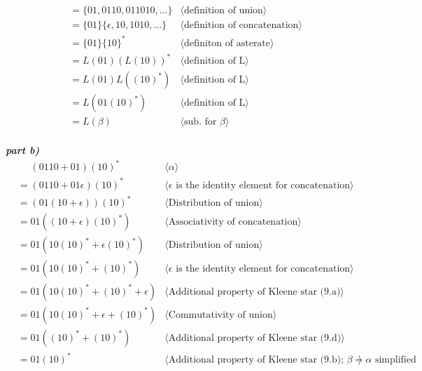 \documentclass[11pt,fleqn]{article}
\newcommand{\pnote}[1]{{\langle \text{#1} \rangle}}
\begin{document}
\begin{align*}
    &= \{01, 0110, 011010,...\} & \pnote{definition of union}\\
    &= \{01\}\{\epsilon, 10, 1010,...\} & \pnote{definition of concatenation}\\
    &= \{01\}\{10\}^* & \pnote{definiton of asterate}\\
    &= L(01)(L(10))^* & \pnote{definition of L}\\
    &= L(01)L((10)^*) & \pnote{definition of L}\\
    &= L(01(10)^*) & \pnote{definition of L}\\
    &= L(\beta) & \pnote{sub. for $\beta$}\\
\end{align*}


\textbf{\emph{part b)}}
\begin{align*}
    &\phantom{{}=} (0110+01)(10)^* & \pnote{$\alpha$}\\
    &= (0110+01\epsilon)(10)^* & \pnote{$\epsilon$ is the identity element for concatenation}\\
    &= (01(10+\epsilon))(10)^* & \pnote{Distribution of union}\\
    &= 01((10+\epsilon)(10)^*) & \pnote{Associativity of concatenation}\\
    &= 01(10(10)^*+\epsilon(10)^*) & \pnote{Distribution of union}\\
    &= 01(10(10)^*+(10)^*) & \pnote{$\epsilon$ is the identity element for concatenation}\\
    &= 01(10(10)^*+(10)^*+\epsilon) & \pnote{Additional property of Kleene star (9.a)}\\
    &= 01(10(10)^*+\epsilon+(10)^*) & \pnote{Commutativity of union}\\
    &= 01((10)^*+(10)^*) & \pnote{Additional property of Kleene star (9.d)}\\
    &= 01(10)^* & \pnote{Additional property of Kleene star (9.b); $\beta = \alpha$ simplified}\\
\end{align*}
\end{document}
